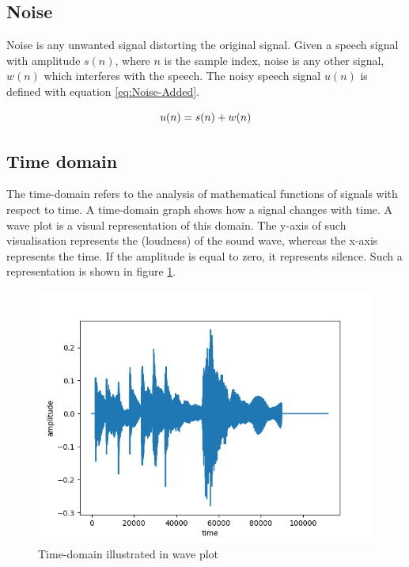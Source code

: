 \subsection{Noise}
\label{sub:Noise}

Noise is any unwanted signal distorting the original signal. Given a speech signal with amplitude $s(n)$, where $n$ is the sample index, noise is any other signal, $w(n)$ which interferes with the speech. The noisy speech signal $u(n)$ is defined with equation \ref{eq:Noise-Added}.

\begin{equation}
    \centering
    u(n) = s(n) + w(n)
    \label{eq:Noise-Added}
\end{equation}

\subsection{Time domain}
\label{sub:Time-Domain}

The time-domain refers to the analysis of mathematical functions of signals with respect to time. A time-domain graph shows how a signal changes with time. 
\newline
\newline
A wave plot is a visual representation of this domain. The y-axis of such visualisation represents the  (loudness) of the sound wave, whereas the x-axis represents the time. If the amplitude is equal to zero, it represents silence. Such a representation is shown in figure \ref{fig:Waveplot-Time-Domain}.

\begin{figure}[htbp]
	\centering
	\includegraphics[scale=0.6]{baa-documentation/img/Waveplot-time-domain.png}
	\caption[Time-domain illustrated in wave plot]{Time-domain illustrated in wave plot \footnotemark}
	\label{fig:Waveplot-Time-Domain}
\end{figure}

